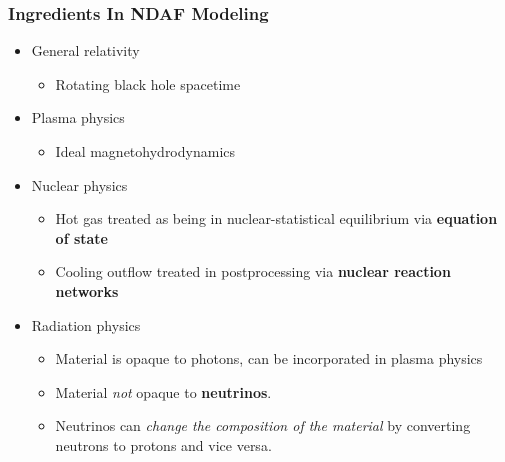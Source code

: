 \documentclass[]{beamer}
\begin{document}
\begin{frame}
  \frametitle{Ingredients In NDAF Modeling}
  \begin{itemize}
  \item General relativity
    \begin{itemize}
    \item Rotating black hole spacetime
    \end{itemize}
  \item Plasma physics
    \begin{itemize}
    \item Ideal magnetohydrodynamics
    \end{itemize}
  \item Nuclear physics
    \begin{itemize}
    \item Hot gas treated as being in nuclear-statistical equilibrium via \textbf{equation of state}
    \item Cooling outflow treated in postprocessing via \textbf{nuclear reaction networks}
    \end{itemize}
  \item Radiation physics
    \begin{itemize}
    \item Material is opaque to photons, can be incorporated in plasma physics
    \item Material \textit{not} opaque to \textbf{neutrinos}.
    \item Neutrinos can \textit{change the composition of the
        material} by converting neutrons to protons and vice versa.
    \end{itemize}
  \end{itemize}
\end{frame}
\end{document}
